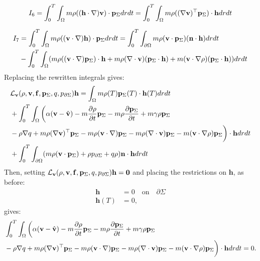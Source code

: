 \begin{align*}
I_6 = \int_0^T \int_\Omega m \rho ((\mathbf{h} \cdot \nabla)\mathbf{v} ) \cdot\mathbf{p}_\Sigma dr dt = \int_0^T \int_\Omega m \rho ((\nabla \mathbf{v})^\top\mathbf{p}_\Sigma) \cdot  \mathbf{h} dr dt
\end{align*}

\begin{align*}
I_7&=\int_0^T \int_\Omega m \rho ((\mathbf{v} \cdot \nabla)\mathbf{h}) \cdot \mathbf{p}_\Sigma dr dt
= \int_0^T \int_{\partial \Omega} m \rho (\mathbf{v} \cdot \mathbf{p}_\Sigma)(\mathbf{n} \cdot \mathbf{h})dr dt \\
&- \int_0^T \int_\Omega (m \rho ((\mathbf{v} \cdot \nabla)\mathbf{p}_\Sigma)\cdot \mathbf{h} + m \rho (\nabla \cdot \mathbf{v})(\mathbf{p}_\Sigma \cdot \mathbf{h}) + m (\mathbf{v} \cdot \nabla \rho)(\mathbf{p}_\Sigma \cdot \mathbf{h}))drdt
\end{align*}
Replacing the rewritten integrals gives:
\begin{align*}
&\mathcal{L}_{\mathbf{v}}(\rho,\mathbf{v},\mathbf{f},\mathbf{p}_\Sigma,q,p_{\partial \Sigma}) \mathbf{h} = \int_\Omega m \rho(T) \mathbf{p}_\Sigma(T) \cdot \mathbf{h}(T) dr dt\\
&+\int_0^T \int_\Omega 
\bigg(\alpha(\mathbf{v} - \hat {\mathbf{v}})   - m \frac{\partial \rho}{\partial t} \mathbf{p}_\Sigma  -  m\rho \frac{\partial \mathbf{p}_\Sigma}{\partial t} +m \gamma \rho \mathbf{p}_\Sigma\\
&-\rho\nabla q +m \rho (\nabla \mathbf{v})^\top\mathbf{p}_\Sigma 
-m \rho (\mathbf{v} \cdot \nabla)\mathbf{p}_\Sigma - m \rho (\nabla \cdot \mathbf{v})\mathbf{p}_\Sigma  - m (\mathbf{v} \cdot \nabla \rho)\mathbf{p}_\Sigma  \bigg)\cdot  \mathbf{h} drdt\\
& +\int_0^T \int_{\partial\Omega} ( m \rho (\mathbf{v} \cdot \mathbf{p}_\Sigma)+\rho  p_{\partial \Sigma} + q \rho)  \mathbf{n}\cdot \mathbf{h} dr dt\\
\end{align*}
Then, setting $\mathcal{L}_{\mathbf{v}}(\rho,\mathbf{v},\mathbf{f},\mathbf{p}_\Sigma,q,p_{\partial \Sigma}) \mathbf{h}=\mathbf{0}$ and placing the restrictions on $\mathbf{h}$, as before:
\begin{align*}
\mathbf{h}&=0 \quad \text{on} \quad \partial \Sigma\\
\mathbf{h}(T)&=0,
\end{align*}
gives:
\begin{align*}
&\int_0^T \int_\Omega 
\bigg(\alpha(\mathbf{v} - \hat {\mathbf{v}})   - m \frac{\partial \rho}{\partial t} \mathbf{p}_\Sigma  -  m\rho \frac{\partial \mathbf{p}_\Sigma}{\partial t} +m \gamma \rho \mathbf{p}_\Sigma\\
&-\rho\nabla q +m \rho (\nabla \mathbf{v})^\top\mathbf{p}_\Sigma 
-m \rho (\mathbf{v} \cdot \nabla)\mathbf{p}_\Sigma - m \rho (\nabla \cdot \mathbf{v})\mathbf{p}_\Sigma  - m (\mathbf{v} \cdot \nabla \rho)\mathbf{p}_\Sigma  \bigg)\cdot  \mathbf{h} drdt=0.
\end{align*}
